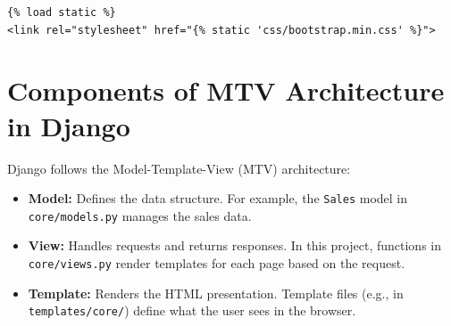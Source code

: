 \documentclass[12pt]{article}
\begin{document}
\begin{verbatim}
{% load static %}
<link rel="stylesheet" href="{% static 'css/bootstrap.min.css' %}">
\end{verbatim}

\section{Components of MTV Architecture in Django}
Django follows the Model-Template-View (MTV) architecture:
\begin{itemize}
    \item \textbf{Model:} Defines the data structure. For example, the \texttt{Sales} model in 
    \texttt{core/models.py} manages the sales data.
    \item \textbf{View:} Handles requests and returns responses. In this project, functions in 
    \texttt{core/views.py} render templates for each page based on the request.
    \item \textbf{Template:} Renders the HTML presentation. Template files 
    (e.g., in \texttt{templates/core/}) define what the user sees in the browser.
\end{itemize}
\end{document}

